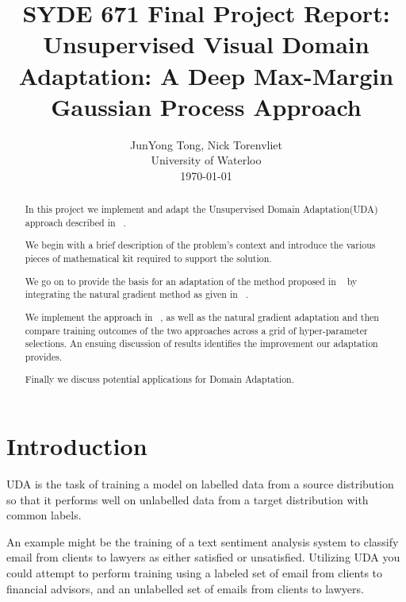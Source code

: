 \documentclass[10pt,twocolumn,letterpaper]{article}
\begin{document}
\title{SYDE 671 Final Project Report:\\
Unsupervised Visual Domain Adaptation: A Deep Max-Margin Gaussian Process Approach}

\author{JunYong Tong, Nick Torenvliet\\
University of Waterloo\\
\today
}

\maketitle

\begin{abstract}
In this project we implement and adapt the Unsupervised Domain Adaptation(UDA) approach described in ~\cite{kim2019unsupervised}.

We begin with a brief description of the problem's context and introduce the various pieces of mathematical kit required to support the solution.  

We go on to provide the basis for an adaptation of the method proposed in ~\cite{kim2019unsupervised} by integrating the natural gradient method as given in ~\cite{khan2018fast}.  

We implement the approach in ~\cite{kim2019unsupervised}, as well as the natural gradient adaptation and then compare training outcomes of the two approaches across a grid of hyper-parameter selections.  An ensuing discussion of results identifies the improvement our adaptation provides.

Finally we discuss potential applications for Domain Adaptation.
\end{abstract}

\section{Introduction}

UDA is the task of training a model on labelled data from a source distribution so that it performs well on unlabelled data from a target distribution with common labels. 

An example might be the training of a text sentiment analysis system to classify email from clients to lawyers as either satisfied or unsatisfied.  Utilizing UDA you could attempt to perform training using a labeled set of email from clients to financial advisors, and an unlabelled set of emails from clients to lawyers.  
\end{document}
